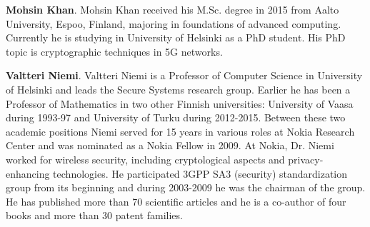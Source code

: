\documentclass{river-journal}
\begin{document}
\medskip
\noindent
{\bf Mohsin Khan}. Mohsin Khan received his M.Sc. degree in 2015 from Aalto University, Espoo, Finland, majoring in foundations of advanced computing. Currently he is studying in University of Helsinki as a PhD student. His PhD topic is cryptographic techniques in 5G networks. \\


\hspace{-18pt}

\medskip
\noindent
{\bf Valtteri Niemi}. Valtteri Niemi is a Professor of Computer Science in University of Helsinki and leads the Secure Systems research group. Earlier he has been a Professor of Mathematics in two other Finnish universities: University of Vaasa during 1993-97 and University of Turku during 2012-2015. Between these two academic positions Niemi served for 15 years in various roles at Nokia Research Center and was nominated as a Nokia Fellow in 2009. At Nokia, Dr. Niemi worked for wireless security, including cryptological aspects and privacy-enhancing technologies. He participated 3GPP SA3 (security) standardization group from its beginning and during 2003-2009 he was the chairman of the group. He has published more than 70 scientific articles and he is a co-author of four books and more than 30 patent families.
\end{document}
